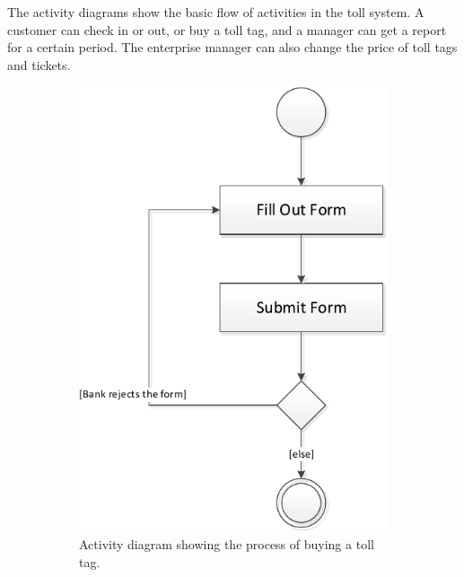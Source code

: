 The activity diagrams show the basic flow of activities in the toll system. A customer can check in or out, or buy a toll tag, and a manager can get a report for a certain period. The enterprise manager can also change the price of toll tags and tickets.

\begin{figure}[H]
	\centering
	\begin{subfigure}[b]{0.3\textwidth}
	\includegraphics[width=\textwidth]{img/activity_diagrams/Buy_toll_tag}
	\caption{Activity diagram showing the process of buying a toll tag.}
	\end{subfigure}
	~
	\begin{subfigure}[b]{0.5\textwidth}

\end{subfigure}
\end{figure}
